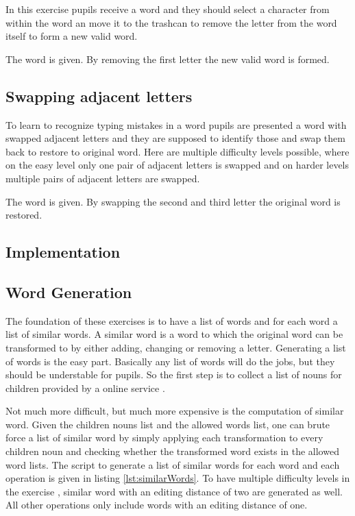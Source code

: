 In this exercise pupils receive a word and they should select a character from within the word an move it to the trashcan to remove the letter from the word itself to form a new valid word.

\begin{example}
    The word  is given. By removing the first letter the new valid word  is formed.
\end{example}

\subsection*{Swapping adjacent letters}
\label{subsection:swappingLetters}

To learn to recognize typing mistakes in a word pupils are presented a word with swapped adjacent letters and they are supposed to identify those and swap them back to restore to original word. Here are multiple difficulty levels possible, where on the easy level only one pair of adjacent letters is swapped and on harder levels multiple pairs of adjacent letters are swapped.

\begin{example}
    The word  is given. By swapping the second and third letter the original word  is restored.
\end{example}

\subsection{Implementation}

\subsection*{Word Generation}

The foundation of these exercises is to have a list of words and for each word a list of similar words. A similar word is a word to which the original word can be transformed to by either adding, changing or removing a letter. Generating a list of words is the easy part. Basically any list of words will do the jobs, but they should be understable for pupils. So the first step is to collect a list of nouns for children provided by a online service \cite{}. 

Not much more difficult, but much more expensive is the computation of similar word. Given the children nouns list and the allowed words list, one can brute force a list of similar word by simply applying each transformation to every children noun and checking whether the transformed word exists in the allowed word lists. The script to generate a list of similar words for each word and each operation is given in listing \ref{lst:similarWords}. To have multiple difficulty levels in the exercise , similar word with an editing distance of two are generated as well. All other operations only include words with an editing distance of one.


